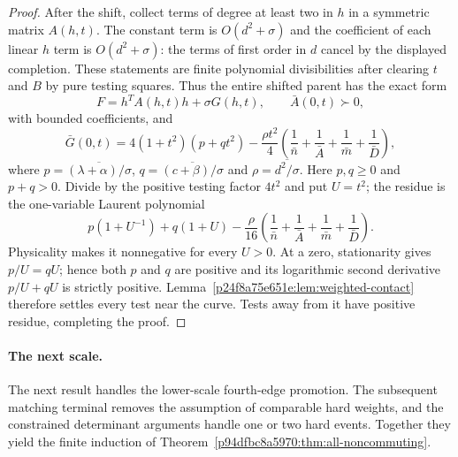 \begin{proof}
After the shift, collect terms of degree at least two in $h$ in a symmetric matrix $A(h,t)$. The constant term is $O(d^2+\sigma)$ and the coefficient of each linear $h$ term is $O(d^2+\sigma)$: the terms of first order in $d$ cancel by the displayed completion. These statements are finite polynomial divisibilities after clearing $t$ and $B$ by pure testing squares. Thus the entire shifted parent has the exact form
\[
F=h^TA(h,t)h+\sigma G(h,t),\qquad
\bar A(0,t)\succ0,
\]
with bounded coefficients, and
\[
\bar G(0,t)=4(1+t^2)(p+qt^2)
 -\frac{\rho t^2}{4}\left(\frac1{\bar n}+\frac1{\bar A}+\frac1{\bar m}+\frac1{\bar D}\right),
\]
where $p=\overline{(\lambda+\alpha)/\sigma}$,
$q=\overline{(c+\beta)/\sigma}$ and $\rho=\overline{d^2/\sigma}$.
Here $p,q\ge0$ and $p+q>0$. Divide by the positive testing factor $4t^2$ and put $U=t^2$; the residue is the one-variable Laurent polynomial
\[
p(1+U^{-1})+q(1+U)
 -\frac\rho{16}\left(\frac1{\bar n}+\frac1{\bar A}+\frac1{\bar m}+\frac1{\bar D}\right).
\]
Physicality makes it nonnegative for every $U>0$. At a zero, stationarity gives $p/U=qU$; hence both $p$ and $q$ are positive and its logarithmic second derivative $p/U+qU$ is strictly positive. Lemma~\ref{p24f8a75e651e:lem:weighted-contact} therefore settles every test near the curve. Tests away from it have positive residue, completing the proof.
\end{proof}

\paragraph{The next scale.}
The next result handles the lower-scale fourth-edge promotion. The subsequent matching terminal removes the assumption of comparable hard weights, and the constrained determinant arguments handle one or two hard events. Together they yield the finite induction of Theorem~\ref{p94dfbc8a5970:thm:all-noncommuting}.

